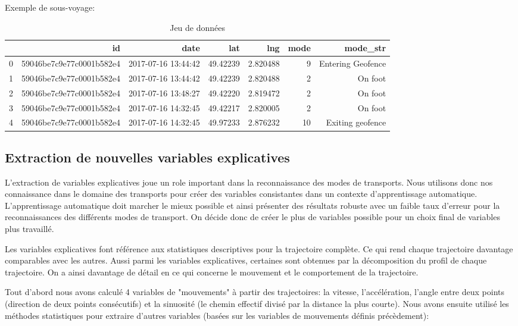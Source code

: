 \documentclass{article}
\begin{document}
Exemple de sous-voyage:

\begin{table}[H]
\centering
\captionsetup{justification=centering}
    \caption{Jeu de données}
\begin{tabular}{rrrrrrr}
  \hline
 & id & date & lat & lng & mode & mode\_str\\ 
  \hline
0 & 59046be7c9e77c0001b582e4 & 2017-07-16 13:44:42 & 49.42239 & 2.820488 & 9 & Entering Geofence \\
1 & 59046be7c9e77c0001b582e4 & 2017-07-16 13:44:42 & 49.42239 & 2.820488 & 2 & On foot  \\
2 & 59046be7c9e77c0001b582e4 & 2017-07-16 13:48:27 & 49.42220 & 2.819472 & 2 & On foot \\
3 & 59046be7c9e77c0001b582e4 & 2017-07-16 14:32:45 & 49.42217 & 2.820005  & 2 & On foot \\
4 & 59046be7c9e77c0001b582e4 & 2017-07-16 14:32:45 & 49.97233 & 2.876232  & 10 & Exiting geofence \\
   
\end{tabular}
\end{table}



\subsection{Extraction de nouvelles variables explicatives}

L'extraction de variables explicatives joue un role important dans la reconnaissance des modes de transports.
Nous utilisons donc nos connaissance dans le domaine des transports pour créer des variables consistantes dans un contexte d'apprentissage automatique. L'apprentissage automatique doit marcher le mieux possible et ainsi présenter des résultats robuste avec un faible taux d'erreur pour la reconnaissances des différents modes de transport. On décide donc de créer le plus de variables possible pour un choix final de variables plus travaillé. 

Les variables explicatives font référence aux statistiques descriptives pour la trajectoire complète. Ce qui rend chaque trajectoire davantage comparables avec les autres. Aussi parmi les variables explicatives, certaines sont obtenues par la décomposition du profil de chaque trajectoire. On a ainsi davantage de détail en ce qui concerne le mouvement et le comportement de la trajectoire.

Tout d'abord nous avons calculé 4 variables de "mouvements" à partir des trajectoires: la vitesse, l'accélération, l'angle entre deux points (direction de deux points consécutifs) et la sinuosité (le chemin effectif divisé par la distance la plus courte). Nous avons ensuite utilisé les méthodes statistiques pour extraire d'autres variables (basées sur les variables de mouvements définis précèdement):
\end{document}
